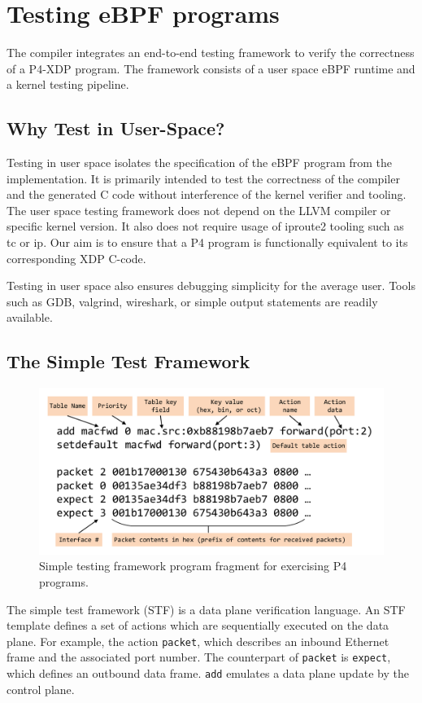 \section{Testing eBPF programs}\label{sec:testing}
The compiler integrates an end-to-end testing framework to verify the 
correctness of a P4-XDP program. The framework consists of a user space eBPF 
runtime and a kernel testing pipeline.

\subsection{Why Test in User-Space?}
Testing in user space isolates the specification of the eBPF program from the
implementation. It is primarily intended to test the correctness of the
compiler and the generated C code without interference of the kernel verifier
and tooling. The user space testing framework does not depend on the LLVM
compiler or specific kernel version. It also does not require usage of iproute2 
tooling such as tc or ip. Our aim is to ensure that a P4 program is functionally
equivalent to its corresponding XDP C-code.

Testing in user space also ensures debugging simplicity for the average
user. Tools such as GDB, valgrind, wireshark, or simple output statements
are readily available.

\subsection{The Simple Test Framework}
\begin{figure}
	\centering
	\includegraphics[width=\linewidth]{stf}
	\caption{Simple testing framework program fragment for exercising P4 programs.}
	\label{fig:stf}
\end{figure}
The simple test framework (STF) is a data plane verification language. 
An STF template defines a set of actions which are sequentially executed on the 
data plane.
For example, the action \texttt{packet}, which describes an inbound Ethernet 
frame and the associated port number. The counterpart of \texttt{packet} is 
\texttt{expect}, which defines an outbound data frame. \texttt{add} emulates a 
data plane update by the control plane. 

